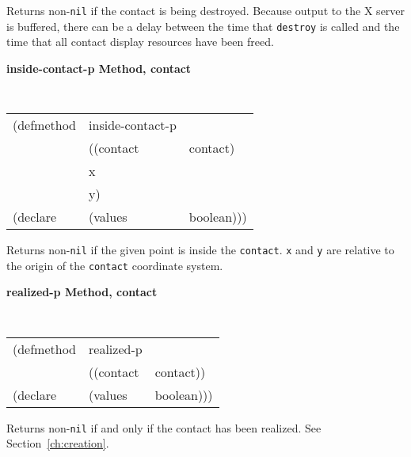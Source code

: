 \documentclass[twoside]{book}
\begin{document}
\begin{sloppy}
{\begin{flushright}
{}\end{flushright}}

\begin{flushright} \parbox[t]{6.125in}{
Returns non-{\tt nil} if the contact is being destroyed. Because output to the X
server is buffered, there can be a delay between the time that {\tt destroy} is
called and the time that all contact display resources have been freed.

}\end{flushright}



{\samepage
{\large {\bf inside-contact-p \hfill Method, contact}} 
\begin{flushright} \parbox[t]{6.125in}{
\tt
\begin{tabular}{lll}
\raggedright
(defmethod & inside-contact-p & \\ 
& ((contact & contact)\\
&  x\\
&  y) \\
(declare &(values  & boolean)))
\end{tabular}
\rm

}\end{flushright}}

\begin{flushright} \parbox[t]{6.125in}{
Returns non-{\tt nil} if the given point  is
inside the {\tt contact}. {\tt x} and {\tt y} are relative to the origin of the
{\tt contact} coordinate system.

}\end{flushright}



{\samepage
{\large {\bf realized-p \hfill Method, contact}}

\begin{flushright} \parbox[t]{6.125in}{
\tt
\begin{tabular}{lll}
\raggedright
(defmethod & realized-p & \\
& ((contact  &contact))\\
(declare &(values & boolean)))
\end{tabular}
\rm

}\end{flushright}}

\begin{flushright} \parbox[t]{6.125in}{
Returns non-{\tt nil} if and only if the contact has been realized.
See Section~\ref{ch:creation}.

}
\end{flushright}
\end{sloppy}
\end{document}
